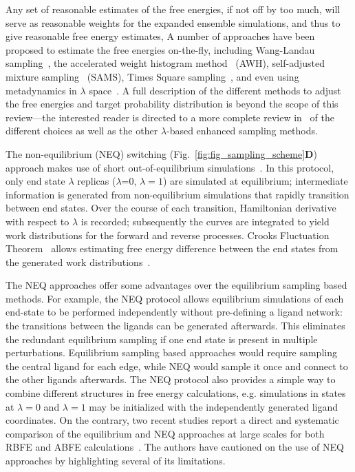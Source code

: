 \documentclass[9pt,bestpractices]{livecoms}
\begin{document}
Any set of reasonable estimates of the free energies, if not off by too much, will serve as reasonable weights for the expanded ensemble simulations, and thus to give reasonable free energy estimates, A number of approaches have been proposed to estimate the free energies on-the-fly, including Wang-Landau sampling~\cite{wang2001efficient}, the accelerated weight histogram method~\cite{lindahl2014accelerated} (AWH), self-adjusted mixture sampling~\cite{tan2017optimally} (SAMS), Times Square sampling~\cite{predescu2024times}, and even using metadynamics in $\lambda$ space~\cite{hsu2023alchemical}. A full description of the different methods to adjust the free energies and target probability distribution is beyond the scope of this review---the interested reader is directed to a more complete review in~\cite{henin2022enhanced} of the different choices as well as the other $\lambda$-based enhanced sampling methods.  

The non-equilibrium (NEQ) switching (Fig.~\ref{fig:fig_sampling_scheme}\textbf{D}) approach makes use of short out-of-equilibrium simulations~\cite{aldeghi2018accurate}. In this protocol, only end state $\lambda$ replicas ($\lambda$=0, $\lambda=1$) are simulated at equilibrium; intermediate information is generated from non-equilibrium simulations that rapidly transition between end states. 
Over the course of each transition, Hamiltonian derivative with respect to $\lambda$ is recorded; subsequently the curves are integrated to yield work distributions for the forward and reverse processes. Crooks Fluctuation Theorem~\cite{crooks1999entropy} allows estimating free energy difference between the end states from the generated work distributions~\cite{shirts2003equilibrium}.

The NEQ approaches offer some advantages over the equilibrium sampling based methods. For example, the NEQ protocol allows equilibrium simulations of each end-state to be performed independently without pre-defining a ligand network: the transitions between the ligands can be generated afterwards. This eliminates the redundant equilibrium sampling if one end state is present in multiple perturbations. Equilibrium sampling based approaches would require sampling the central ligand for each edge, while NEQ would sample it once and connect to the other ligands afterwards. The NEQ protocol also provides a simple way to combine different structures in free energy calculations, e.g. simulations in states at $\lambda=0$ and $\lambda=1$ may be initialized with the independently generated ligand coordinates. On the contrary, two recent studies report a direct and systematic comparison of the equilibrium and NEQ approaches at large scales for both RBFE and ABFE calculations~\cite{wan2023eqvsneq, bhati2025}. The authors have cautioned on the use of NEQ approaches by highlighting several of its limitations.
\end{document}
